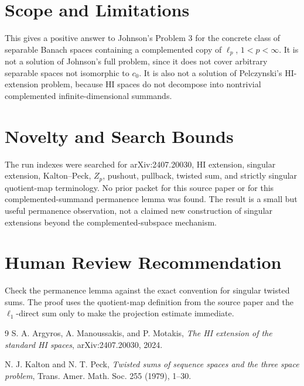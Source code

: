 \documentclass[11pt]{article}
\begin{document}
\section*{Scope and Limitations}

This gives a positive answer to Johnson's Problem 3 for the concrete class of
separable Banach spaces containing a complemented copy of \(\ell_p\),
\(1<p<\infty\). It is not a solution of Johnson's full problem, since it does
not cover arbitrary separable spaces not isomorphic to \(c_0\). It is also not
a solution of Pelczynski's HI-extension problem, because HI spaces do not
decompose into nontrivial complemented infinite-dimensional summands.

\section*{Novelty and Search Bounds}

The run indexes were searched for arXiv:2407.20030, HI extension, singular
extension, Kalton--Peck, \(Z_p\), pushout, pullback, twisted sum, and strictly
singular quotient-map terminology. No prior packet for this source paper or
for this complemented-summand permanence lemma was found. The result is a
small but useful permanence observation, not a claimed new construction of
singular extensions beyond the complemented-subspace mechanism.

\section*{Human Review Recommendation}

Check the permanence lemma against the exact convention for singular twisted
sums. The proof uses the quotient-map definition from the source paper and the
\(\ell_1\)-direct sum only to make the projection estimate immediate.

\begin{thebibliography}{9}
S. A. Argyros, A. Manoussakis, and P. Motakis,
\emph{The HI extension of the standard HI spaces}, arXiv:2407.20030, 2024.

N. J. Kalton and N. T. Peck,
\emph{Twisted sums of sequence spaces and the three space problem},
Trans. Amer. Math. Soc. 255 (1979), 1--30.
\end{thebibliography}
\end{document}
